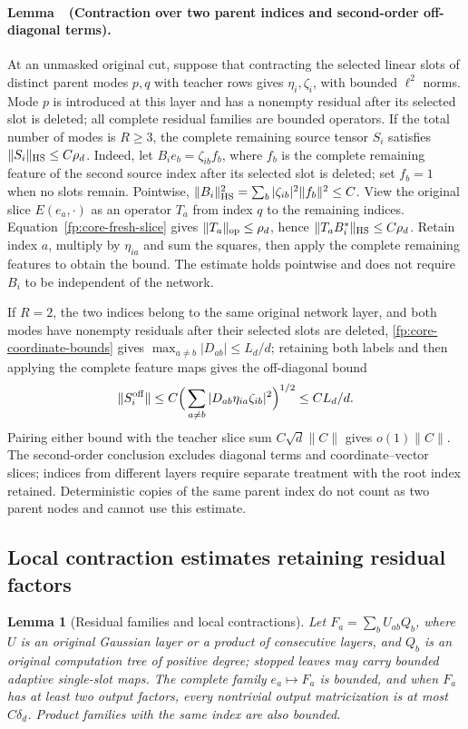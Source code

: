 \documentclass[a4paper]{tufte-handout}
\newtheorem{lemma}{Lemma}
\begin{document}
\begin{fullwidth}
\paragraph{Lemma~\thelemma\ (Contraction over two parent indices and second-order off-diagonal terms).}
\label{fp:core-two-parent}
At an unmasked original cut, suppose that contracting the selected linear slots of distinct parent modes $p,q$ with teacher rows
gives $\eta_i,\zeta_i$, with bounded $\ell^2$ norms. Mode $p$ is introduced at this layer
and has a nonempty residual after its selected slot is deleted; all complete residual families are bounded operators.
If the total number of modes is $R\ge3$, the complete remaining source tensor $S_i$ satisfies $\|S_i\|_{\rm HS}\le C\rho_d$.
Indeed, let $B_ie_b=\zeta_{ib}f_b$, where $f_b$ is the complete remaining
feature of the second source index after its selected slot is deleted; set $f_b=1$ when no slots remain. Pointwise,
$\|B_i\|_{\rm HS}^2=\sum_b|\zeta_{ib}|^2\|f_b\|^2\le C$.
View the original slice $E(e_a,\cdot)$ as an operator $T_a$ from index $q$ to the remaining indices.
Equation~\eqref{fp:core-fresh-slice} gives $\|T_a\|_{\rm op}\le\rho_d$, hence
$\|T_aB_i^*\|_{\rm HS}\le C\rho_d$.
Retain index $a$, multiply by $\eta_{ia}$ and sum the squares, then apply the complete remaining features to obtain the bound.
The estimate holds pointwise and does not require $B_i$ to be independent of the network.

If $R=2$, the two indices belong to the same original network layer, and both modes have nonempty residuals after their selected slots are deleted, \eqref{fp:core-coordinate-bounds} gives
$\max_{a\ne b}|D_{ab}|\le L_d/d$; retaining both labels and then applying the complete feature maps gives the off-diagonal bound
\[
 \|S_i^{\rm off}\|\le C\Big(\sum_{a\ne b}|D_{ab}\eta_{ia}\zeta_{ib}|^2\Big)^{1/2}
 \le CL_d/d.
\]
Pairing either bound with the teacher slice sum $C\sqrt d\|C\|$ gives $o(1)\|C\|$.
The second-order conclusion excludes diagonal terms and coordinate--vector slices; indices from different layers require separate treatment with the root index retained.
Deterministic copies of the same parent index do not count as two parent nodes and cannot use this estimate.

\subsection{Local contraction estimates retaining residual factors}\label{fp:core-residual-section}

\begin{lemma}[Residual families and local contractions]\label{fp:core-residual-flat}
\label{fp:core-local-contraction}\label{fp:core-split-hit}
\label{fp:core-hybrid-Rge2}\label{fp:core-hybrid-R1}
Let $F_a=\sum_bU_{ab}Q_b$, where $U$ is an original Gaussian layer or a product of consecutive layers, and $Q_b$ is an original computation tree of positive degree;
stopped leaves may carry bounded adaptive single-slot maps. The complete family $e_a\mapsto F_a$ is bounded,
and when $F_a$ has at least two output factors, every nontrivial output matricization is at most $C\delta_d$.
Product families with the same index are also bounded.


\end{lemma}
\end{fullwidth}
\end{document}
